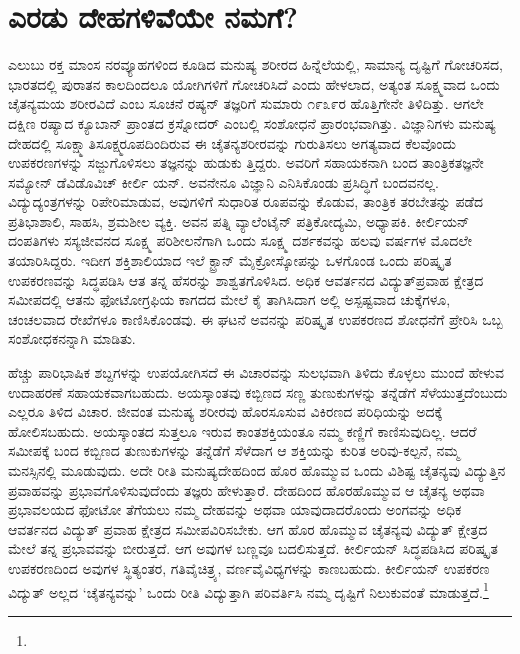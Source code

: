 \section{ಎರಡು ದೇಹಗಳಿವೆಯೇ ನಮಗೆ?}

ಎಲುಬು ರಕ್ತ ಮಾಂಸ ನರವ್ಯೂಹಗಳಿಂದ ಕೂಡಿದ ಮನುಷ್ಯ ಶರೀರದ ಹಿನ್ನೆಲೆಯಲ್ಲಿ, ಸಾಮಾನ್ಯ ದೃಷ್ಟಿಗೆ ಗೋಚರಿಸದ, ಭಾರತದಲ್ಲಿ ಪುರಾತನ ಕಾಲದಿಂದಲೂ ಯೋಗಿಗಳಿಗೆ ಗೋಚರಿಸಿದೆ ಎಂದು ಹೇಳಲಾದ, ಅತ್ಯಂತ ಸೂಕ್ಷ್ಮವಾದ ಒಂದು ಚೈತನ್ಯಮಯ ಶರೀರವಿದೆ ಎಂಬ ಸೂಚನೆ ರಷ್ಯನ್ ತಜ್ಞರಿಗೆ ಸುಮಾರು ೧೯೩೯ರ ಹೊತ್ತಿಗೇನೇ ತಿಳಿದಿತ್ತು. ಆಗಲೇ ದಕ್ಷಿಣ ರಷ್ಯಾದ ಕ್ಯೂಬಾನ್ ಪ್ರಾಂತದ ಕ್ರಸ್ನೋದರ್ ಎಂಬಲ್ಲಿ ಸಂಶೋಧನೆ ಪ್ರಾರಂಭವಾಗಿತ್ತು. ವಿಜ್ಞಾನಿಗಳು ಮನುಷ್ಯ ದೇಹದಲ್ಲಿ ಸೂಕ್ಷ್ಮಾತಿಸೂಕ್ಷ್ಮರೂಪದಿಂದಿರುವ ಈ ಚೈತನ್ಯಶರೀರವನ್ನು ಗುರುತಿಸಲು ಅಗತ್ಯವಾದ ಕೆಲವೊಂದು ಉಪಕರಣಗಳನ್ನು ಸಜ್ಜುಗೊಳಿಸಲು ತಜ್ಞನನ್ನು ಹುಡುಕು ತ್ತಿದ್ದರು. ಅವರಿಗೆ ಸಹಾಯಕನಾಗಿ ಬಂದ ತಾಂತ್ರಿಕತಜ್ಞನೇ ಸಮ್ಯೋನ್ ಡೆವಿಡೊವಿಚ್ ಕೀರ್ಲಿ ಯನ್. ಅವನೇನೂ ವಿಜ್ಞಾನಿ ಎನಿಸಿಕೊಂಡು ಪ್ರಸಿದ್ಧಿಗೆ ಬಂದವನಲ್ಲ. ವಿದ್ಯುದ್ಯಂತ್ರಗಳನ್ನು ರಿಪೇರಿಮಾಡುವ, ಅವುಗಳಿಗೆ ಸುಧಾರಿತ ರೂಪವನ್ನು ಕೊಡುವ, ತಾಂತ್ರಿಕ ತರಬೇತನ್ನು ಪಡೆದ ಪ್ರತಿಭಾಶಾಲಿ, ಸಾಹಸಿ, ಶ್ರಮಶೀಲ ವ್ಯಕ್ತಿ. ಅವನ ಪತ್ನಿ ವ್ಯಾಲೆಂಟೈನ್ ಪತ್ರಿಕೋದ್ಯಮಿ, ಅಧ್ಯಾಪಕಿ. ಕೀರ್ಲಿಯನ್ ದಂಪತಿಗಳು ಸಸ್ಯಜೀವನದ ಸೂಕ್ಷ್ಮ ಪರಿಶೀಲನೆಗಾಗಿ ಒಂದು ಸೂಕ್ಷ್ಮ ದರ್ಶಕವನ್ನು ಹಲವು ವರ್ಷಗಳ ಮೊದಲೇ ತಯಾರಿಸಿದ್ದರು. ಇದೀಗ ಶಕ್ತಿಶಾಲಿಯಾದ ಇಲೆ ಕ್ಟ್ರಾನ್ ಮೈಕ್ರೋಸ್ಕೋಪನ್ನು ಒಳಗೊಂಡ ಒಂದು ಪರಿಷ್ಕೃತ ಉಪಕರಣವನ್ನು ಸಿದ್ಧಪಡಿಸಿ ಆತ ತನ್ನ ಹೆಸರನ್ನು ಶಾಶ್ವತಗೊಳಿಸಿದ. ಅಧಿಕ ಆವರ್ತನದ ವಿದ್ಯುತ್​ಪ್ರವಾಹ ಕ್ಷೇತ್ರದ ಸಮೀಪದಲ್ಲಿ ಆತನು ಫೋಟೋಗ್ರಫಿಯ ಕಾಗದದ ಮೇಲೆ ಕೈ ತಾಗಿಸಿದಾಗ ಅಲ್ಲಿ ಅಸ್ಪಷ್ಟವಾದ ಚುಕ್ಕೆಗಳೂ, ಚಂಚಲವಾದ ರೇಖೆಗಳೂ ಕಾಣಿಸಿಕೊಂಡವು. ಈ ಘಟನೆ ಅವನನ್ನು ಪರಿಷ್ಕೃತ ಉಪಕರಣದ ಶೋಧನೆಗೆ ಪ್ರೇರಿಸಿ ಒಬ್ಬ ಸಂಶೋಧಕನನ್ನಾಗಿ ಮಾಡಿತು.

ಹೆಚ್ಚು ಪಾರಿಭಾಷಿಕ ಶಬ್ದಗಳನ್ನು ಉಪಯೋಗಿಸದೆ ಈ ವಿಚಾರವನ್ನು ಸುಲಭವಾಗಿ ತಿಳಿದು ಕೊಳ್ಳಲು ಮುಂದೆ ಹೇಳುವ ಉದಾಹರಣೆ ಸಹಾಯಕವಾಗಬಹುದು. ಅಯಸ್ಕಾಂತವು ಕಬ್ಬಿಣದ ಸಣ್ಣ ತುಣುಕುಗಳನ್ನು ತನ್ನೆಡೆಗೆ ಸೆಳೆಯುತ್ತದೆಂಬುದು ಎಲ್ಲರೂ ತಿಳಿದ ವಿಚಾರ. ಜೀವಂತ ಮನುಷ್ಯ ಶರೀರವು ಹೊರಸೂಸುವ ವಿಕಿರಣದ ಪರಿಧಿಯನ್ನು ಅದಕ್ಕೆ ಹೋಲಿಸಬಹುದು. ಅಯಸ್ಕಾಂತದ ಸುತ್ತಲೂ ಇರುವ ಕಾಂತಶಕ್ತಿಯಂತೂ ನಮ್ಮ ಕಣ್ಣಿಗೆ ಕಾಣಿಸುವುದಿಲ್ಲ. ಆದರೆ ಸಮೀಪಕ್ಕೆ ಬಂದ ಕಬ್ಬಿಣದ ತುಣುಕುಗಳನ್ನು ತನ್ನೆಡೆಗೆ ಸೆಳೆದಾಗ ಆ ಶಕ್ತಿಯನ್ನು ಕುರಿತ ಅರಿವು-ಕಲ್ಪನೆ, ನಮ್ಮ ಮನಸ್ಸಿನಲ್ಲಿ ಮೂಡುವುದು. ಅದೇ ರೀತಿ ಮನುಷ್ಯದೇಹದಿಂದ ಹೊರ ಹೊಮ್ಮುವ ಒಂದು ವಿಶಿಷ್ಟ ಚೈತನ್ಯವು ವಿದ್ಯುತ್ತಿನ ಪ್ರವಾಹವನ್ನು ಪ್ರಭಾವಗೊಳಿಸುವುದೆಂದು ತಜ್ಞರು ಹೇಳುತ್ತಾರೆ. ದೇಹದಿಂದ ಹೊರಹೊಮ್ಮುವ ಆ ಚೈತನ್ಯ ಅಥವಾ ಪ್ರಭಾವಲಯದ ಫೋಟೋ ತೆಗೆಯಲು ನಮ್ಮ ದೇಹವನ್ನು ಅಥವಾ ಯಾವುದಾದರೊಂದು ಅಂಗವನ್ನು ಅಧಿಕ ಆವರ್ತನದ ವಿದ್ಯುತ್ ಪ್ರವಾಹ ಕ್ಷೇತ್ರದ ಸಮೀಪವಿರಿಸಬೇಕು. ಆಗ ಹೊರ ಹೊಮ್ಮುವ ಚೈತನ್ಯವು ವಿದ್ಯುತ್ ಕ್ಷೇತ್ರದ ಮೇಲೆ ತನ್ನ ಪ್ರಭಾವವನ್ನು ಬೀರುತ್ತದೆ. ಆಗ ಅವುಗಳ ಬಣ್ಣವೂ ಬದಲಿಸುತ್ತದೆ. ಕೀರ್ಲಿಯನ್ ಸಿದ್ಧಪಡಿಸಿದ ಪರಿಷ್ಕೃತ ಉಪಕರಣದಿಂದ ಅವುಗಳ ಸ್ಥಿತ್ಯಂತರ, ಗತಿವೈಚಿತ್ರ್ಯ, ವರ್ಣವೈವಿಧ್ಯಗಳನ್ನು ಕಾಣಬಹುದು. ಕೀರ್ಲಿಯನ್ ಉಪಕರಣ ವಿದ್ಯುತ್ ಅಲ್ಲದ ‘ಚೈತನ್ಯವನ್ನು’ ಒಂದು ರೀತಿ ವಿದ್ಯುತ್ತಾಗಿ ಪರಿವರ್ತಿಸಿ ನಮ್ಮ ದೃಷ್ಟಿಗೆ ನಿಲುಕುವಂತೆ ಮಾಡುತ್ತದೆ.\footnote{}

